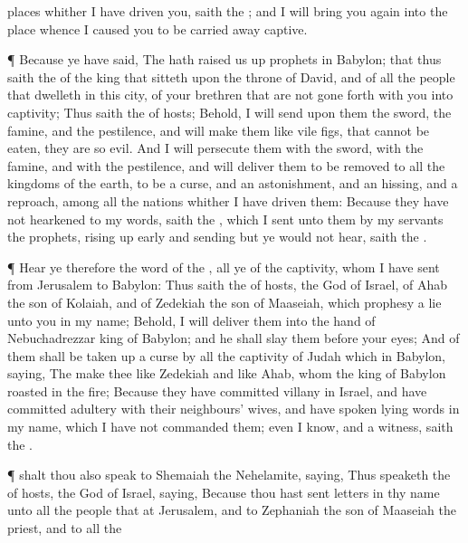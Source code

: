 {places whither I have
driven you,
saith the
{}; and I will bring you
again into the
place whence I caused you to be carried away
captive.
\par }{\PP {}¶ Because ye have
said, The
{} hath raised us
up
prophets in
Babylon;
 that thus
saith the
{} of the
king that
sitteth upon the
throne of
David, and of all the
people that
dwelleth in this
city,
{} of your
brethren that are not gone
forth with you into
captivity;
Thus
saith the
{} of
hosts; Behold, I will
send upon them the
sword, the
famine, and the
pestilence, and will
make them like
vile
figs, that cannot be
eaten, they are so
evil.
And I will
persecute
them with the
sword, with the
famine, and with the
pestilence, and will
deliver them to be
removed to all the
kingdoms of the
earth, to be a
curse, and an
astonishment, and an
hissing, and a
reproach, among all the
nations whither I have
driven them:
Because they have not
hearkened to my
words,
saith the
{}, which I
sent unto them by my
servants the
prophets, rising up
early and
sending
{} but ye would not
hear,
saith the
{}.
\par }{\PP {}¶
Hear ye therefore the
word of the
{}, all ye of the
captivity, whom I have
sent from
Jerusalem to
Babylon:
Thus
saith the
{} of
hosts, the
God of
Israel, of
Ahab the
son of
Kolaiah, and of
Zedekiah the
son of
Maaseiah, which
prophesy a
lie unto you in my
name; Behold, I will
deliver them into the
hand of
Nebuchadrezzar
king of
Babylon; and he shall
slay them before your
eyes;
And of them shall be taken
up a
curse by all the
captivity of
Judah which
{} in
Babylon,
saying, The
{}
make thee like
Zedekiah and like
Ahab, whom the
king of
Babylon
roasted in the
fire;
Because they have
committed
villany in
Israel, and have
committed
adultery with their
neighbours’
wives, and have
spoken
lying
words in my
name, which I have not
commanded them; even I
know, and
{} a
witness,
saith the
{}.
\par }{\PP {}¶
{} shalt thou also
speak to
Shemaiah the
Nehelamite,
saying,
Thus
speaketh the
{} of
hosts, the
God of
Israel,
saying, Because thou hast
sent
letters in thy
name unto all the
people that
{} at
Jerusalem, and to
Zephaniah the
son of
Maaseiah the
priest, and to all the
}
